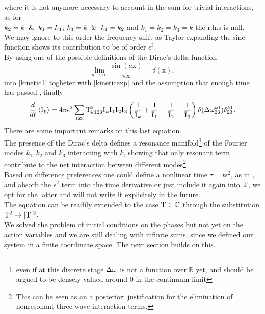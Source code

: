 where it is not anymore necessary to account in the sum for trivial 
interactions, as for \\ $k_2=k \hspace{2mm}\&\hspace{2mm} k_1 = k_3$, $k_3=k \hspace{2mm}\& \hspace{2mm}k_1=k_2$ and $k_1=k_2=k_3=k$ the r.h.s is null.\\
We may ignore to this order the frequency shift as Taylor expanding the sine function shows its contribution to be of order $\epsilon^3$. \\
By using one of the possible definitions of the Dirac's delta function
\begin{equation}
    \underset{a \rightarrow \infty}{\lim} \frac{\sin(a \mathrm{x})}{\pi\mathrm{x}} = \delta(\mathrm{x}),
    \label{delta}
\end{equation}
into \eqref{kinetic1} togheter with \eqref{kineticexp} and the assumption that enough time has passed
, finally
\begin{equation}
    \frac{d}{dt} \left\langle \mathrm{I}^{}_k\right\rangle = 4 \pi\epsilon^2 \sum_{123} \mathrm{T}^2_{k123}\bar{\mathrm{I}^{}}_k\bar{\mathrm{I}^{}}_1\bar{\mathrm{I}^{}}_2\bar{\mathrm{I}^{}}_3
    \left(\frac{1}{\bar{\mathrm{I}^{}}_k} + \frac{1}{\bar{\mathrm{I}^{}}_1} - \frac{1}{\bar{\mathrm{I}^{}}_2}- \frac{1}{\bar{\mathrm{I}^{}}_3}  \right)
    \delta(\Delta{\omega}^{k1}_{23})\delta^{k1}_{23}.
    \label{kinetic2}
\end{equation}
There are some important remarks on this last equation. \\
The presence of the Dirac's delta defines a resonance manifold\footnote{even if at this discrete stage $\Delta{\omega}$ is not a function over $\mathbb{R}$ yet,
 and should be argued to be densely valued around $0$ in the continuum limit} of the Fourier modes $k_1, k_2$ and $k_3$ interacting with $k$, 
 showing that only resonant term contribute to the net interaction between different modes\footnote{
    This can be seen as an a posteriori justification for the elimination of nonresonant three wave interaction terms.
}. \\
Based on difference preferences one could define a nonlinear time $\tau = t \epsilon^2$, as in \cite{Onorato2020}, and absorb the 
$\epsilon^2$ term into the time derivative or just include it again into $\mathrm{T}$, we opt for the latter and will not write it explicitely in the future. \\
The equation can be readily extended to the case $\mathrm{T} \in \mathbb{C}$ through the substitution $\mathrm{T}^2 \rightarrow |\mathrm{T}|^2$.\\
We solved the problem of initial conditions on the phases but not yet on the action variables and we are still dealing with infinite sums, since we defined our system
in a finite coordinate space. The next section builds on this. 

